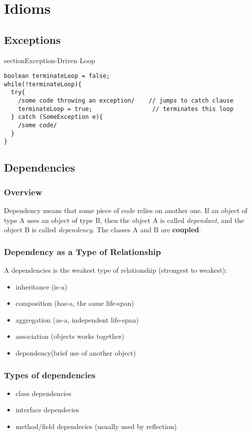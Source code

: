 \documentclass{report}
\begin{document}
\part{Idioms}

\chapter{Exceptions}
section{Exception-Driven Loop}
\begin{verbatim}
boolean terminateLoop = false;
while(!terminateLoop){
  try{
    /some code throwing an exception/    // jumps to catch clause
    terminateLoop = true;                 // terminates this loop
  } catch (SomeException e){
    /some code/
  }
}
\end{verbatim}








\chapter{Dependencies}
\section{Overview}
Dependency means that some piece of code relies on another one. If an object of type A uses an object of type B, 
then the object A is called \textit{dependant}, and the object B is called \textit{dependency}. The classes A and B are \textbf{coupled}. 

\section{Dependency as a Type of Relationship}
A dependencies is the weakest
type of relationship (strongest to weakest):
\begin{itemize}
	\item inheritance (is-a)
	\item composition (has-a, the same life-span)
	\item aggregation (as-a, independent life-span)
	\item association (objects works together)
	\item dependency(brief use of another object)
\end{itemize}

\section{Types of dependencies}
\begin{itemize}
	\item class dependencies
	\item interface dependecies
	\item method/field dependecies (usually used by reflection)
\end{itemize}
\end{document}
